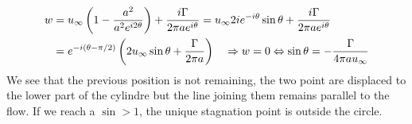 	\begin{equation}
	\begin{aligned}
		w &= u_\infty \left( 1-\frac{a^2}{a^2e^{i2\theta}}\right)+\frac{i\Gamma}{2\pi ae^{i\theta}} = u_\infty 2ie^{-i\theta}\sin \theta + \frac{i\Gamma}{2\pi ae^{i\theta}}\\
		 &= e^{-i(\theta -\pi /2)}\left( 2u_\infty \sin \theta + \frac{\Gamma}{2\pi a} \right) \quad \Rightarrow w = 0 \Leftrightarrow \sin \theta = -\frac{\Gamma }{4\pi a u_\infty}
	\end{aligned}
	\end{equation}
	We see that the previous position is not remaining, the two point are displaced to the lower part of the cylindre but the line joining them remains parallel to the flow. If we reach a $\sin > 1$, the unique stagnation point is outside the circle. \\
	
